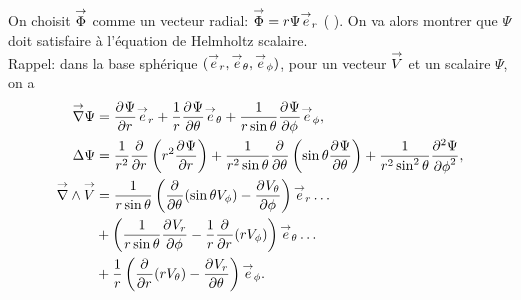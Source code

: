 On choisit \(\vect \Phi\) comme un vecteur radial: \(\vect \Phi = r \Psi \vect e_r\) ( \cite[p.~84]{bohren_absorption_2004} ). On va alors montrer que \(\Psi\) doit satisfaire à l'équation de Helmholtz scalaire.\\

Rappel: dans la base sphérique \((\vect e_r, \vect e_\theta, \vect e_\phi)\), pour
un vecteur \(\vect V\)
et un scalaire \(\Psi\), on a
\begin{align*}
\vgrad \Psi &= \ddr{r}{\Psi} \vect e_r + \frac{1}{r}\ddr{\theta}{\Psi}\vect e_\theta + \frac{1}{r\sin\theta}\ddr{\phi}{\Psi} \vect e_\phi,
\\
 \Delta \Psi & = \frac{1}{r^2}\ddr{r}{}\left(r^2\ddr{r}{\Psi}\right)
+ \frac{1}{r^2\sin\theta}\ddr{\theta}{}\left(\sin\theta\ddr{\theta}{\Psi}\right)
+ \frac{1}{r^2\sin^2\theta}\ddr[2]{\phi}{\Psi},
\\
\vrot \vect V &= \frac{1}{r\sin\theta}\left(\ddr{\theta}{}(\sin\theta V_\phi)-\ddr{\phi}{V_\theta}\right)\vect e_r \dots\\
&+ \left(\frac{1}{r\sin\theta}\ddr{\phi}{V_r} - \frac{1}{r}\ddr{r}{}(rV_\phi)\right) \vect e_\theta \dots \\
&+ \frac{1}{r}\left( \ddr{r}{}(rV_\theta) - \ddr{\theta}{V_r}\right)\vect e_\phi.
\end{align*}


